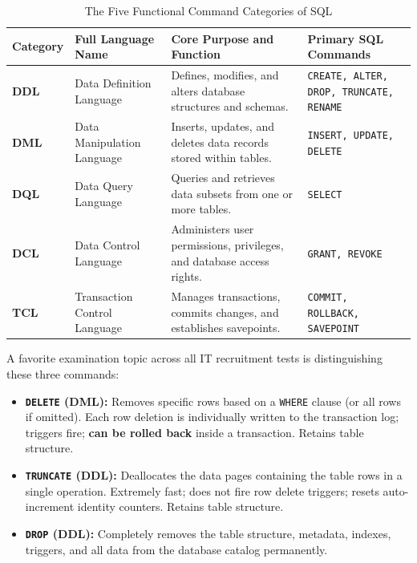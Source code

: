 \begin{table}[htbp]
\centering
\caption{The Five Functional Command Categories of SQL}
\label{tab:sql_command_categories}
\begin{tabularx}{\textwidth}{l p{3.2cm} X p{4.2cm}}
\toprule
\textbf{Category} & \textbf{Full Language Name} & \textbf{Core Purpose and Function} & \textbf{Primary SQL Commands} \\
\midrule
\textbf{DDL} & Data Definition Language & Defines, modifies, and alters database structures and schemas. & \texttt{CREATE, ALTER, DROP, TRUNCATE, RENAME} \\
\textbf{DML} & Data Manipulation Language & Inserts, updates, and deletes data records stored within tables. & \texttt{INSERT, UPDATE, DELETE} \\
\textbf{DQL} & Data Query Language & Queries and retrieves data subsets from one or more tables. & \texttt{SELECT} \\
\textbf{DCL} & Data Control Language & Administers user permissions, privileges, and database access rights. & \texttt{GRANT, REVOKE} \\
\textbf{TCL} & Transaction Control Language & Manages transactions, commits changes, and establishes savepoints. & \texttt{COMMIT, ROLLBACK, SAVEPOINT} \\
\bottomrule
\end{tabularx}
\end{table}

\begin{tcolorbox}[colback=teal!5!white,colframe=teal!60!black,title=\textbf{Crucial Examination Invariant: DROP versus TRUNCATE versus DELETE}]
A favorite examination topic across all IT recruitment tests is distinguishing these three commands:
\begin{itemize}
\item \textbf{\texttt{DELETE} (DML):} Removes specific rows based on a \texttt{WHERE} clause (or all rows if omitted). Each row deletion is individually written to the transaction log; triggers fire; \textbf{can be rolled back} inside a transaction. Retains table structure.
\item \textbf{\texttt{TRUNCATE} (DDL):} Deallocates the data pages containing the table rows in a single operation. Extremely fast; does not fire row delete triggers; resets auto-increment identity counters. Retains table structure.
\item \textbf{\texttt{DROP} (DDL):} Completely removes the table structure, metadata, indexes, triggers, and all data from the database catalog permanently.
\end{itemize}
\end{tcolorbox}



